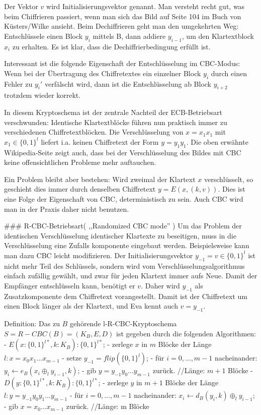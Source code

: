 \documentclass[a4paper]{article}
\begin{document}
\begin{multicols}{3}
Der Vektor $v$ wird Initialisierungsvektor genannt. Man versteht recht gut, was beim Chiffrieren passiert, wenn man sich das Bild auf Seite 104 im Buch von Küsters/Wilke ansieht. Beim Dechiffrieren geht man den umgekehrten Weg: Entschlüssele einen Block $y_i$ mittels B, dann addiere $y_{i-1}$, um den Klartextblock $x_i$ zu erhalten. Es ist klar, dass die Dechiffrierbedingung erfüllt ist.

Interessant ist die folgende Eigenschaft der Entschlüsselung im CBC-Modus: Wenn bei der Übertragung des Chiffretextes ein einzelner Block $y_i$ durch einen Fehler zu $y_i′$ verfälscht wird, dann ist die Entschlüsselung ab Block $y_{i+2}$ trotzdem wieder korrekt.

In diesem Kryptoschema ist der zentrale Nachteil der ECB-Betriebsart verschwunden: Identische Klartextblöcke führen nun praktisch immer zu verschiedenen Chiffretextblöcken. Die Verschlüsselung von $x=x_1 x_1$ mit $x_1\in\{0,1\}^l$ liefert i.a. keinen Chiffretext der Form $y=y_1 y_1$. Die oben erwähnte Wikipedia-Seite zeigt auch, dass bei der Verschlüsselung des Bildes mit CBC keine offensichtlichen Probleme mehr auftauchen.

Ein Problem bleibt aber bestehen: Wird zweimal der Klartext $x$ verschlüsselt, so geschieht dies immer durch denselben Chiffretext $y=E(x,(k,v))$. Dies ist eine Folge der Eigenschaft von CBC, deterministisch zu sein. Auch CBC wird man in der Praxis daher nicht benutzen.

### R-CBC-Betriebsart( ,,Randomized CBC mode'' )
Um das Problem der identischen Verschlüsselung identischer Klartexte zu beseitigen, muss in die Verschlüsselung eine Zufalls komponente eingebaut werden. Beispielsweise kann man dazu CBC leicht modifizieren. Der Initialisierungsvektor $y_{-1}=v\in\{0,1\}^l$  ist nicht mehr Teil des Schlüssels, sondern wird vom Verschlüsselungsalgorithmus einfach zufällig gewählt, und zwar für jeden Klartext immer aufs Neue. Damit der Empfänger entschlüsseln kann, benötigt er $v$. Daher wird $y_{-1}$ als Zusatzkomponente dem Chiffretext vorangestellt. Damit ist der Chiffretext um einen Block länger als der Klartext, und Eva kennt auch $v=y_{-1}$.

Definition: Das zu $B$ gehörende l-R-CBC-Kryptoschema $S=R-CBC(B) = (K_B,E,D)$ ist gegeben durch die folgenden Algorithmen:
- $E(x:\{0,1\}^{l*},k:K_B) :\{0,1\}^{l*}$;
    - zerlege $x$ in $m$ Blöcke der Länge $l:x=x_0 x_1 ...x_{m-1}$
    - setze $y_{-1}= flip(\{0,1\}^l)$;
    - für $i=0,...,m-1$ nacheinander: $y_i\leftarrow e_B(x_i\oplus_l y_{i-1} ,k)$;
    - gib $y=y_{-1} y_0 ...y_{m-1}$ zurück. //Länge: $m+1$ Blöcke
- $D(y:\{0,1\}^{l*},k:K_B) :\{0,1\}^{l*}$;
    - zerlege $y$ in $m+1$ Blöcke der Länge $l:y=y_{-1} y_0 y_1 ...y_{m-1}$
    - für $i=0,...,m-1$ nacheinander: $x_i\leftarrow d_B(y_i,k)\oplus_l y_{i-1}$;
    - gib $x=x_0 ...x_{m-1}$ zurück. //Länge: m Blöcke


\end{multicols}
\end{document}
